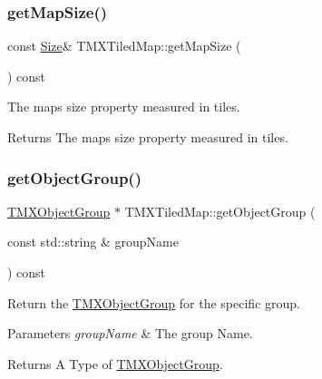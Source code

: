 \subsubsection{\texorpdfstring{get\+Map\+Size()}{getMapSize()}\hspace{0.1cm}{\footnotesize\ttfamily [2/2]}}
{\footnotesize\ttfamily const \hyperlink{classSize}{Size}\& T\+M\+X\+Tiled\+Map\+::get\+Map\+Size (\begin{DoxyParamCaption}{ }\end{DoxyParamCaption}) const\hspace{0.3cm}{\ttfamily [inline]}}

The map\textquotesingle{}s size property measured in tiles.

\begin{DoxyReturn}{Returns}
The map\textquotesingle{}s size property measured in tiles. 
\end{DoxyReturn}
\mbox{\label{classTMXTiledMap_a4addb02e0b8a56ab145b3a4162b4e6b8}} 
\subsubsection{\texorpdfstring{get\+Object\+Group()}{getObjectGroup()}\hspace{0.1cm}{\footnotesize\ttfamily [1/2]}}
{\footnotesize\ttfamily \hyperlink{classTMXObjectGroup}{T\+M\+X\+Object\+Group} $\ast$ T\+M\+X\+Tiled\+Map\+::get\+Object\+Group (\begin{DoxyParamCaption}\item[{const std\+::string \&}]{group\+Name }\end{DoxyParamCaption}) const}

Return the \hyperlink{classTMXObjectGroup}{T\+M\+X\+Object\+Group} for the specific group.


\begin{DoxyParams}{Parameters}
{\em group\+Name} & The group Name. \\
\hline
\end{DoxyParams}
\begin{DoxyReturn}{Returns}
A Type of \hyperlink{classTMXObjectGroup}{T\+M\+X\+Object\+Group}. 
\end{DoxyReturn}
\mbox{\label{classTMXTiledMap_a98a13b3c2eda3af05814fb859dad8ac1}} 
